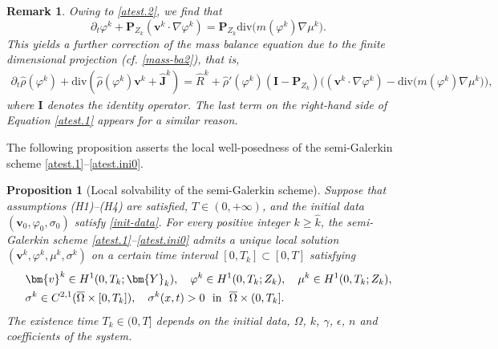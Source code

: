 \documentclass[11pt,reqno]{amsart}
\newtheorem{proposition}{\textbf{Proposition}}[section]
\newtheorem{remark}{\textbf{Remark}}[section]
\def\bp{\begin{proposition}}
\def\ep{\end{proposition}}
\def\div{\mathrm{div}}
\def\J{\mathbf{J}}
\def\vv{\bm{v}}
\begin{document}
\begin{remark}\rm
Owing to \eqref{atest.2}, we find that
$$
 \partial_t\varphi^k + \bm{P}_{Z_{k}}(\bm{v}^k\cdot\nabla\varphi^k)
=\bm{P}_{Z_{k}}\div \big(m(\varphi^k)\nabla \mu^k\big).
$$
This yields a further correction of the mass balance equation due to the finite dimensional projection (cf. \eqref{mass-ba2}), that is,
%
\begin{align}
 \partial_t\widehat{\rho}(\varphi^k) + \div(\widehat{\rho}(\varphi^k)\vv^k+\widehat{\J}^k)
=\widehat{R}^k+\widehat{\rho}'(\varphi^k)(\bm{I}-\bm{P}_{Z_{k}})\big((\bm{v}^k\cdot\nabla\varphi^k)-\div \big(m(\varphi^k)\nabla \mu^k\big)\big),
\label{R-app}
\end{align}
%
where $\bm{I}$ denotes the identity operator. The last term on the right-hand side of Equation \eqref{atest.1} appears for a similar reason.
\end{remark}

The following proposition asserts the local well-posedness of the semi-Galerkin scheme \eqref{atest.1}--\eqref{atest.ini0}.
%
\bp[Local solvability of the semi-Galerkin scheme]\label{p1}
Suppose that assumptions (H1)--(H4) are satisfied, $T \in (0,+\infty)$, and the initial data $(\bm{v}_0,\varphi_0,\sigma_0)$ satisfy \eqref{init-data}. For every positive integer $k\geq \widehat{k}$, the semi-Galerkin scheme \eqref{atest.1}--\eqref{atest.ini0} admits a unique local solution $(\bm{v}^{k},\varphi^{k},\mu^{k},\sigma^{k})$ on a certain time interval $[0,T_{k}]\subset[0,T]$ satisfying
%
\begin{align}
&\bm{v}^{k} \in H^1(0,T_{k};\bm{Y}_k),
\quad \varphi^{k} \in H^1(0,T_{k};Z_{k}),
\quad \mu^k\in H^1(0,T_k;Z_{k}),
\notag \\
&\sigma^{k}\in C^{2,1}(\overline{\Omega}\times [0,T_k]),
\quad \sigma^k(x, t) > 0  \ \ \text{in } \ \overline{\Omega}\times (0,T_k].
\notag
\end{align}
%
The existence time $T_{k}\in (0,T]$ depends on the initial data, $\Omega$, $k$, $\gamma$, $\epsilon$, $n$  and coefficients of the system.
\ep
\end{document}
